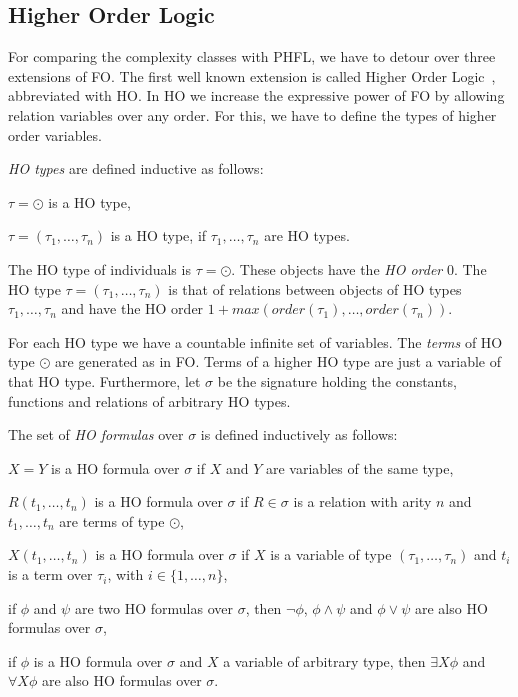 

\subsection{Higher Order Logic}\label{subsec:higherOrderLogic}

For comparing the complexity classes with PHFL, we have to detour over three extensions of FO. The first well known
extension is called Higher Order Logic~\cite{vanBenthem2001higher}, abbreviated with HO. In HO we
increase the expressive power of FO by allowing relation variables over any order. For this, we have to define the
types of higher order variables.

\begin{definition}
    \emph{HO types} are defined inductive as follows:
    \begin{compactitem}
        \item $\tau = \odot$ is a HO type,
        \item $\tau = (\tau_1, \dots, \tau_n)$ is a HO type, if $\tau_1, \dots, \tau_n$ are
        HO types.
    \end{compactitem}
\end{definition}

The HO type of individuals is $\tau = \odot$. These objects have the \textit{HO order} $0$. The HO type $\tau = (\tau_1,
\dots, \tau_n)$ is that of relations between objects of HO types $\tau_1, \dots, \tau_n$ and have the HO order $1 + max
(order(\tau_1), \dots, order(\tau_n))$.

For each HO type we have a countable infinite set of variables. The \textit{terms} of HO type $\odot$ are
generated as in FO. Terms of a higher HO type are just a variable of that HO type. Furthermore, let $\sigma$ be
the signature holding the constants, functions and relations of arbitrary HO types.

\begin{definition}
    The set of \emph{HO formulas} over $\sigma$ is defined inductively as follows:
    \begin{compactitem}
        \item $X = Y$ is a HO formula over $\sigma$ if $X$ and $Y$ are variables of the same type,
        \item $R(t_1, \dots, t_n)$ is a HO formula over $\sigma$ if $R \in \sigma$ is a relation with arity $n$ and
        $t_1, \dots, t_n$ are terms of type $\odot$,
        \item $X(t_1, \dots, t_n)$ is a HO formula over $\sigma$ if $X$ is a variable of type $(\tau_1, \dots, \tau_n)$
        and $t_i$ is a term over $\tau_i$, with $i \in \{1, \dots, n\}$,
        \item if $\phi$ and $\psi$ are two HO formulas over $\sigma$, then $\neg\phi$, $\phi\wedge\psi$ and $\phi
        \vee \psi$ are also HO formulas over $\sigma$,
        \item if $\phi$ is a HO formula over $\sigma$ and $X$ a variable of arbitrary type, then $\exists X\phi$ and
        $\forall X\phi$ are also HO formulas over $\sigma$.
    \end{compactitem}
\end{definition}

